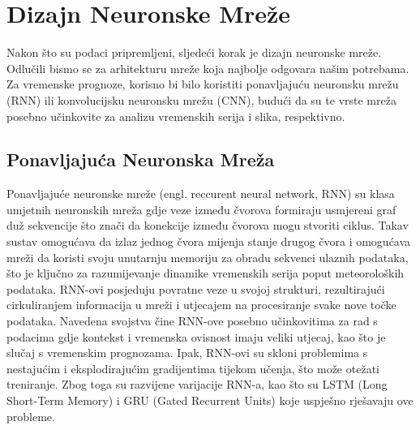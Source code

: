 \documentclass[times, utf8, zavrsni]{fer}
\begin{document}
\section{Dizajn Neuronske Mreže}
Nakon što su podaci pripremljeni, sljedeći korak je dizajn neuronske mreže. Odlučili bismo se za arhitekturu mreže koja najbolje odgovara našim potrebama. Za vremenske prognoze, korisno bi bilo koristiti ponavljajuću neuronsku mrežu (RNN) ili konvolucijsku neuronsku mrežu (CNN), budući da su te vrste mreža posebno učinkovite za analizu vremenskih serija i slika, respektivno.

\subsection{Ponavljajuća Neuronska Mreža }
Ponavljajuće neuronske mreže (engl. reccurent neural network, RNN) su klasa umjetnih neuronskih mreža gdje veze između čvorova formiraju usmjereni graf duž sekvencije što znači da konekcije između čvorova mogu stvoriti ciklus. Takav sustav omogućava da izlaz jednog čvora mijenja stanje drugog čvora i omogućava mreži da koristi svoju unutarnju memoriju za obradu sekvenci ulaznih podataka, što je ključno za razumijevanje dinamike vremenskih serija poput meteoroloških podataka. RNN-ovi posjeduju povratne veze u svojoj strukturi, rezultirajući cirkuliranjem informacija u mreži i utjecajem na procesiranje svake nove točke podataka. Navedena svojstva čine RNN-ove posebno učinkovitima za rad s podacima gdje kontekst i vremenska ovisnost imaju veliki utjecaj, kao što je slučaj s vremenskim prognozama. Ipak, RNN-ovi su skloni problemima s nestajućim i eksplodirajućim gradijentima tijekom učenja, što može otežati treniranje. Zbog toga su razvijene varijacije RNN-a, kao što su LSTM (Long Short-Term Memory) i GRU (Gated Recurrent Units) koje uspješno rješavaju ove probleme.
\end{document}
